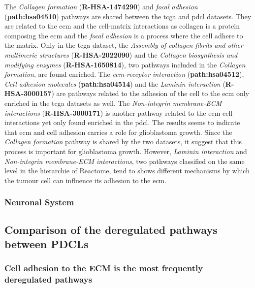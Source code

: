 The \textit{Collagen formation} (\textbf{R-HSA-1474290}) and \textit{focal adhesion} (\textbf{path:hsa04510}) pathways are shared between the \acrshort{tcga} and \acrshort{pdcl} datasets.
They are related to the \acrlong{ecm} and the cell-matrix interactions as collagen is a protein composing the \acrshort{ecm} and the \textit{focal adhesion} is a process where the cell adhere to the matrix.
Only in the \acrshort{tcga} dataset, the \textit{Assembly of collagen fibrils and other multimeric structures} (\textbf{R-HSA-2022090}) and the \textit{Collagen biosynthesis and modifying enzymes} (\textbf{R-HSA-1650814}), two pathways included in the \textit{Collagen formation}, are found enriched.
The \textit{\acrshort{ecm}-receptor interaction} (\textbf{path:hsa04512}), \textit{Cell adhesion molecules} (\textbf{path:hsa04514}) and the \textit{Laminin interaction} (\textbf{R-HSA-3000157}) are pathways related to the adhesion of the cell to the \acrshort{ecm} only enriched in the \acrshort{tcga} datasets as well.
The \textit{Non-integrin membrane-ECM interactions} (\textbf{R-HSA-3000171}) is another pathway related to the \acrshort{ecm}-cell interactions yet only found enriched in the \acrshort{pdcl}.
The results seems to indicate that \acrshort{ecm} and cell adhesion carries a role for glioblastoma growth.
Since the \textit{Collagen formation} pathway is shared by the two datasets, it suggest that this process is important for glioblastoma growth.
However, \textit{Laminin interaction} and \textit{Non-integrin membrane-ECM interactions}, two pathways classified on the same level in the hierarchie of Reactome, tend to shows different mechanisms by which the tumour cell can influence its adhesion to the \acrshort{ecm}.

\subsubsection{Neuronal System}

\subsection{Comparison of the deregulated pathways between PDCLs}

\subsubsection{Cell adhesion to the ECM is the most frequently deregulated pathways}

